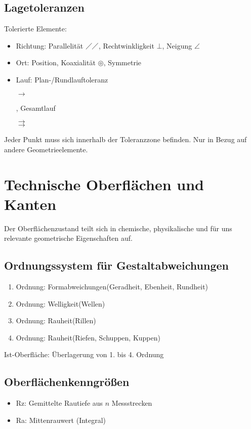 \documentclass[a4paper,DIV=15,fontsize=11pt]{scrartcl}
\begin{document}
\subsection{Lagetoleranzen}
Tolerierte Elemente:
\begin{itemize}
	\item Richtung: Parallelität $\diagup \diagup$, Rechtwinkligkeit $\bot$, Neigung $\angle$
	\item Ort: Position, Koaxialität $\circledcirc$, Symmetrie
	\item Lauf: Plan-/Rundlauftoleranz \begin{rotate}{60} $\rightarrow$ \end{rotate}, Gesamtlauf  \begin{rotate}{60} $\rightrightarrows$ \end{rotate}
\end{itemize}
Jeder Punkt muss sich innerhalb der Toleranzzone befinden. Nur in Bezug auf andere Geometrieelemente.
	
\section{Technische Oberflächen und Kanten}
Der Oberflächenzustand teilt sich in chemische, physikalische und für uns relevante geometrische Eigenschaften auf. 
\subsection{Ordnungssystem für Gestaltabweichungen}
\begin{enumerate}
	\item Ordnung: Formabweichungen(Geradheit, Ebenheit, Rundheit)
	\item Ordnung: Welligkeit(Wellen)
	\item Ordnung: Rauheit(Rillen)
	\item Ordnung: Rauheit(Riefen, Schuppen, Kuppen)
\end{enumerate}

Ist-Oberfläche: Überlagerung von 1. bis 4. Ordnung

\subsection{Oberflächenkenngrößen}
\begin{itemize}
	\item Rz: Gemittelte Rautiefe aus $n$ Messstrecken 
	\item Ra: Mittenrauwert (Integral)
\end{itemize}
	
\end{document}
